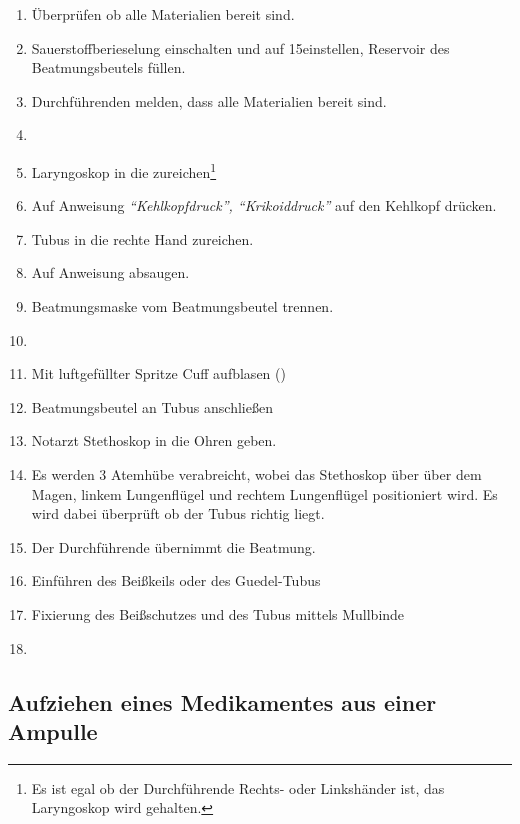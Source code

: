 \begin{enumerate}
  \item Überprüfen ob alle Materialien bereit sind.
  \item Sauerstoffberieselung einschalten und auf 15\LMin einstellen,
  Reservoir des Beatmungsbeutels füllen.
  \item Durchführenden melden, dass alle Materialien bereit sind.
  \item {}
  \item Laryngoskop in die  zureichen\footnote{Es ist egal ob
  der Durchführende Rechts- oder Linkshänder ist, das Laryngoskop wird
   gehalten.}
  \item Auf Anweisung \emph{"`Kehlkopfdruck"', "`Krikoiddruck"'} auf den
  Kehlkopf drücken.
  \item Tubus in die rechte Hand zureichen.
  \item Auf Anweisung absaugen.
  \item Beatmungsmaske vom Beatmungsbeutel trennen.
  \item {}
  \item Mit luftgefüllter Spritze Cuff aufblasen ()
  \item Beatmungsbeutel an Tubus anschließen
  \item Notarzt Stethoskop in die Ohren geben.
  \item Es werden 3 Atemhübe verabreicht, wobei das
  Stethoskop über über dem Magen, linkem Lungenflügel und
  rechtem Lungenflügel positioniert wird. Es wird dabei überprüft ob der Tubus richtig liegt.
  \item Der Durchführende übernimmt die Beatmung.
  \item Einführen des Beißkeils oder des Guedel-Tubus
  \item Fixierung des Beißschutzes und des Tubus mittels Mullbinde
  \item {}
\end{enumerate}

\TakeNotesMedium



\clearpage
\subsection{Aufziehen eines Medikamentes aus einer Ampulle}

